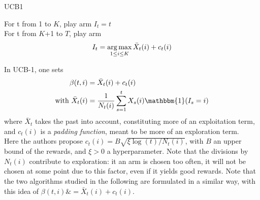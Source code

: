 \begin{algorithm}
    \caption{UCB1}
	\label{alg:ucb1}
    For t from 1 to $K$, play arm $I_t = t$ \\
    For t from $K$+1 to $T$, play arm 
    $$ I_t = \operatorname*{arg\,max}_{1\leq i \leq K} \bar X_t(i) + c_t(i)$$
\end{algorithm}

In UCB-1, one sets 
\begin{align}
\beta(t,i)& =\bar{X}_t(i)+c_t(i)\\
\text{with } \bar{X}_t(i) &= \frac{1}{N_t(i)}\sum_{s=1}^t X_s(i)\mathbbm{1}(I_s=i)
\end{align}
where $\bar{X}_t$ takes the past into account, constituting more of an exploitation term, and $c_t(i)$ is a \textit{padding function}, meant to be more of an exploration term.\\
Here the authors propose $c_t(i)=B\sqrt{\xi \log(t)/N_t(i)}$, with $B$ an upper bound of the rewards, and $\xi>0$ a hyperparameter.
Note that the divisions by $N_t(i)$ contribute to exploration: it an arm is chosen too often, it will not be chosen at some point due to this factor, even if it yields good rewards.
Note that the two algorithms studied in the following are formulated in a similar way, with this idea of $\beta(t,i)\& =\bar{X}_t(i)+c_t(i)$.